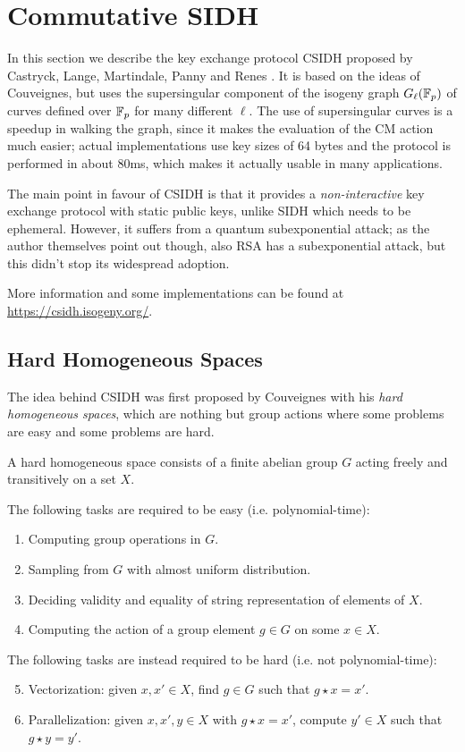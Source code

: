 \section{Commutative SIDH}
In this section we describe the key exchange protocol CSIDH proposed by Castryck, Lange, Martindale, Panny and Renes \cite{CSIDH}. It is based on the ideas of Couveignes, but uses the supersingular component of the isogeny graph $G_\ell(\mathbb{F}_p)$ of curves defined over $\mathbb{F}_p$ for many different $\ell$. The use of supersingular curves is a speedup in walking the graph, since it makes the evaluation of the CM action much easier; actual implementations use key sizes of 64 bytes and the protocol is performed in about 80ms, which makes it actually usable in many applications.

The main point in favour of CSIDH is that it provides a \emph{non-interactive} key exchange protocol with static public keys, unlike SIDH which needs to be ephemeral. However, it suffers from a quantum subexponential attack; as the author themselves point out though, also RSA has a subexponential attack, but this didn't stop its widespread adoption.

More information and some implementations can be found at \url{https://csidh.isogeny.org/}.

\subsection{Hard Homogeneous Spaces}
The idea behind CSIDH was first proposed by Couveignes \cite{Couveignes} with his \emph{hard homogeneous spaces}, which are nothing but group actions where some problems are easy and some problems are hard.

\begin{definition}
    A hard homogeneous space consists of a finite abelian group $G$ acting freely and transitively on a set $X$.
    
    The following tasks are required to be easy (i.e. polynomial-time):
    \begin{enumerate}
        \item Computing group operations in $G$.
        \item Sampling from $G$ with almost uniform distribution.
        \item Deciding validity and equality of string representation of elements of $X$.
        \item Computing the action of a group element $g\in G$ on some $x\in X$.
    \end{enumerate}

    The following tasks are instead required to be hard (i.e. not polynomial-time):
    \begin{enumerate}
        \setcounter{enumi}{4}
        \item Vectorization: given $x,x'\in X$, find $g\in G$ such that $g\star x=x'$.
        \item Parallelization: given $x,x',y\in X$ with $g\star x=x'$, compute $y'\in X$ such that $g\star y=y'$.
    \end{enumerate}
\end{definition}

